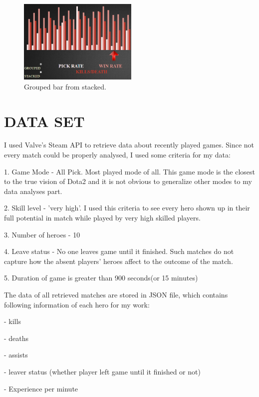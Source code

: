 \documentclass[twocolumn]{autart}    %
\begin{document}
\begin{figure}
\begin{center}
\includegraphics[height=4cm]{grouped.png}    %
\caption{Grouped bar from stacked.}  %
\label{grouped}                                 %
\end{center}                                 %
\end{figure}


\section{DATA SET}
I used Valve's Steam API to retrieve data about recently played games. Since not every match could be properly  analysed, I used some criteria for my data:

	1. Game Mode - All Pick. Most played mode of all. This game mode is the closest
to the true vision of Dota2 and it is not obvious to generalize other modes to my data analyses part. 

	2. Skill level - 'very high'. I used this criteria to see every hero shown up in their full potential in match while played by very high skilled players. 

	3. Number of heroes - 10

	4. Leave status - No one leaves game until it finished. Such matches do not capture how the absent
players' heroes affect to the outcome of the match.		

	5. Duration of game is greater than 900 seconds(or 15 minutes)



The data of all retrieved matches are stored in JSON file, which contains following information of each hero for my work:
	
	- 	kills

	-   deaths

	-   assists

	-   leaver status (whether player left game until it finished or not)

	-   Experience per minute
\end{document}
